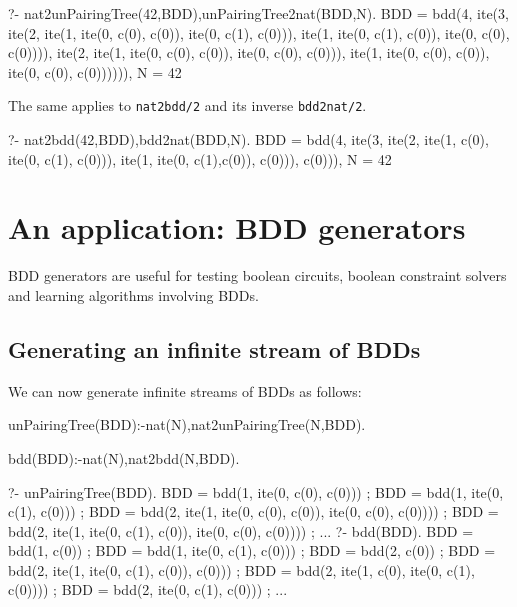 \documentclass[]{INCLUDES/llncs}
\begin{document}
\begin{codex}
?- nat2unPairingTree(42,BDD),unPairingTree2nat(BDD,N).
BDD = bdd(4, 
          ite(3, 
              ite(2, 
                  ite(1, 
                      ite(0, c(0), c(0)), 
                      ite(0, c(1), c(0))), 
                  ite(1, 
                      ite(0, c(1), c(0)), 
                      ite(0, c(0), c(0)))), 
              ite(2, 
                  ite(1, 
                      ite(0, c(0), c(0)), 
                      ite(0, c(0), c(0))), 
                  ite(1, ite(0, c(0), c(0)), 
                         ite(0, c(0), c(0)))))),
N = 42
\end{codex}
\noindent The same applies to {\tt nat2bdd/2} and its 
inverse {\tt bdd2nat/2}.
\begin{codex}
?- nat2bdd(42,BDD),bdd2nat(BDD,N).
BDD = bdd(4, 
          ite(3, 
              ite(2, 
              ite(1, c(0), 
                     ite(0, c(1), c(0))), 
                     ite(1, 
                         ite(0, c(1),c(0)), c(0))), 
                         c(0))),
N = 42
\end{codex}

\section{An application: BDD generators}
BDD generators are useful for testing boolean circuits, boolean constraint
solvers and learning algorithms involving BDDs.

\subsection{Generating an infinite stream of BDDs}
\noindent We can now generate infinite streams of BDDs as follows:
\begin{code}
unPairingTree(BDD):-nat(N),nat2unPairingTree(N,BDD).

bdd(BDD):-nat(N),nat2bdd(N,BDD).
\end{code}
\begin{codex}
?- unPairingTree(BDD).
BDD = bdd(1, ite(0, c(0), c(0))) ;
BDD = bdd(1, ite(0, c(1), c(0))) ;
BDD = bdd(2, ite(1, ite(0, c(0), c(0)), ite(0, c(0), c(0)))) ;
BDD = bdd(2, ite(1, ite(0, c(1), c(0)), ite(0, c(0), c(0)))) ;
...
?- bdd(BDD).
BDD = bdd(1, c(0)) ;
BDD = bdd(1, ite(0, c(1), c(0))) ;
BDD = bdd(2, c(0)) ;
BDD = bdd(2, ite(1, ite(0, c(1), c(0)), c(0))) ;
BDD = bdd(2, ite(1, c(0), ite(0, c(1), c(0)))) ;
BDD = bdd(2, ite(0, c(1), c(0))) ;
...
\end{codex}
\end{document}
